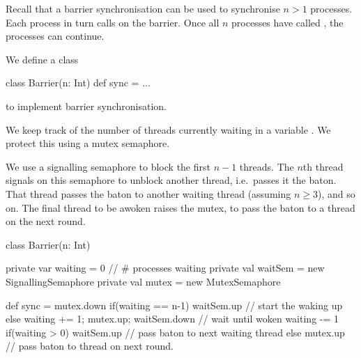 
\begin{slide}

Recall that a barrier synchronisation can be used to synchronise $n>1$
processes.  Each process in turn calls  on the barrier.  Once all
$n$ processes have called , the processes can continue.



We define a class
\begin{scala}
class Barrier(n: Int){ def sync = { ... } }
\end{scala}%
%
to implement barrier synchronisation.  

We keep track of the number of threads currently waiting in a variable
.  We protect this using a mutex semaphore. 

We use a signalling semaphore  to block the first $n-1$
threads.  The $n$th thread signals on this semaphore to unblock
another thread, i.e.~passes it the baton.  That thread passes the
baton to another waiting thread (assuming $n \ge 3$), and so on.  The
final thread to be awoken raises the mutex, to pass the baton to a
thread on the next round.
\end{slide}



\begin{slide}

\begin{scala}
class Barrier(n: Int){
  private var waiting = 0 // # processes waiting
  private val waitSem = new SignallingSemaphore
  private val mutex = new MutexSemaphore

  def sync = {
    mutex.down
    if(waiting == n-1) waitSem.up // start the waking up
    else{ 
      waiting += 1; mutex.up; waitSem.down  // wait until woken
      waiting -= 1
      if(waiting > 0) waitSem.up // pass baton to next waiting thread
      else mutex.up // pass baton to thread on next round.
    }
  }
}
\end{scala}

\end{slide}


